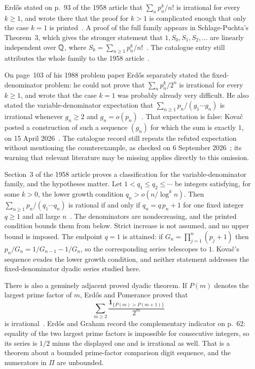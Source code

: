 \documentclass[11pt]{article}
\begin{document}
Erd\H{o}s stated on p.~93 of the 1958 article that $\sum_n p_n^{k}/n!$ is
irrational for every $k\ge1$, and wrote there that the proof for $k>1$ is
complicated enough that only the case $k=1$ is
printed~\cite[pp.~93--95]{erdos1958}.  A proof of the full family appears in
Schlage-Puchta's Theorem~3, which gives the stronger statement that
$1,S_0,S_1,S_2,\ldots$ are linearly independent over $\mathbb{Q}$, where
$S_k=\sum_{n\ge1}p_n^{k}/n!$~\cite[Theorem~3]{schlagepuchta2011}.  The
catalogue entry still attributes the whole family to the 1958
article~\cite{erdosproblems}.

On page~103 of his 1988 problem paper Erd\H{o}s separately stated the
fixed-denominator problem: he could not prove that $\sum_n p_n^{k}/2^{n}$ is
irrational for every $k\ge1$, and wrote that the case $k=1$ was probably
already very difficult.  He also stated the variable-denominator expectation
that $\sum_{n\ge1}p_n/(g_1\cdots g_n)$ is irrational whenever $g_n\ge2$ and
$g_n=o(p_n)$~\cite[p.~103]{erdos1988}.  That expectation is false: Kova\v{c}
posted a construction of such a sequence $(g_n)$ for which the sum is exactly
$1$, on 15 April 2026~\cite[Theorem~1 and proof, pp.~1--2]{kovac2026}.  The
catalogue record still repeats the refuted expectation without mentioning the
counterexample, as checked on 6 September 2026~\cite{erdosproblems}; its
warning that relevant literature may be missing applies directly to this
omission.

Section~3 of the 1958 article proves a classification for the
variable-denominator family, and the hypotheses matter.  Let
$1<q_1\le q_2\le\cdots$ be integers satisfying, for some $k>0$, the lower
growth condition $q_n>o(n/\log^{k}n)$.  Then $\sum_{n\ge1}p_n/(q_1\cdots q_n)$
is rational if and only if $q_n=q\,p_n+1$ for one fixed integer $q\ge1$ and all
large $n$~\cite[pp.~96--97]{erdos1958}.  The denominators are nondecreasing,
and the printed condition bounds them from below.  Strict increase is not
assumed, and no upper bound is imposed.  The endpoint $q=1$ is attained: if
$G_n=\prod_{j=1}^{n}(p_j+1)$ then $p_n/G_n=1/G_{n-1}-1/G_n$, so the
corresponding series telescopes to $1$.  Kova\v{c}'s sequence evades the lower
growth condition, and neither statement addresses the fixed-denominator dyadic
series studied here.

There is also a genuinely adjacent proved dyadic theorem.  If $P(m)$ denotes
the largest prime factor of $m$, Erd\H{o}s and Pomerance proved that
\[
 \sum_{m\ge2}\frac{\mathbf 1_{\{P(m)>P(m+1)\}}}{2^m}
\]
is irrational~\cite[\S7, p.~320]{erdospomerance1978}.  Erd\H{o}s and Graham
record the complementary indicator on p.~62: equality of the two largest prime
factors is impossible for consecutive integers, so its series is $1/2$ minus
the displayed one and is irrational as well.  That is a theorem about a bounded
prime-factor comparison digit sequence, and the numerators in $\Pi$ are
unbounded.
\end{document}
